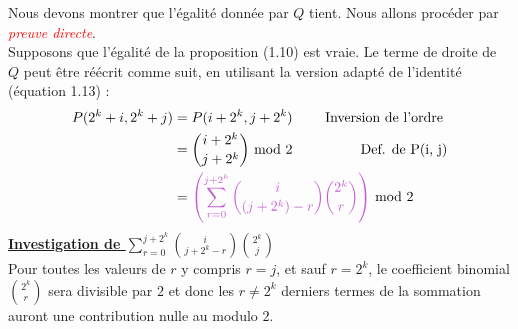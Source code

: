 \documentclass[16pt]{report}
\begin{document}
\begin{multicols*}{2}
        \begin{Preuve*}{}{}
            Nous devons montrer que l'égalité donnée par $Q$ tient. Nous allons procéder 
            par \textcolor{red}{\textit{preuve directe}}. 
            \vspace{1em} \\ 
            Supposons que l'égalité de la proposition (1.10) est vraie. 
            Le terme de droite de $Q$ peut être réécrit comme suit, en utilisant 
            la version adapté de l'identité (équation 1.13) : 
            \begin{align*}
                P(2^k + i, 2^k + j)    &= P(i + 2^k, j + 2^k) 
                                \quad\quad\text{ Inversion de l'ordre } 
                                \\
                                &={i + 2^k \choose j + 2^k} \text{ mod } 2 \text{\;\quad\quad\quad\quad\; 
                Def.  de P(i, j)} 
                \\ 
                              &= \textcolor{myp}{\left( \sum_{r=0}^{j+2^k} 
                              {i \choose (j + 2^k)-r} {2^k \choose r} \right)}
                              \text{ mod } 2
            \end{align*} 
            \underline{\textbf{Investigation de $\sum_{r=0}^{j+2^k} {i \choose j + 2^k- r} {2^k \choose j}$}}
            \vspace{1em} \\ 
        Pour toutes les valeurs de $r$ y compris 
        $r = j$, et sauf $r= 2^k$, le coefficient binomial ${2^k \choose r}$ sera divisible 
        par $2$ et donc les $r \neq 2^k$ derniers termes de la sommation auront une contribution 
        nulle au modulo $2$. 


\end{Preuve*}
\end{multicols*}
\end{document}
